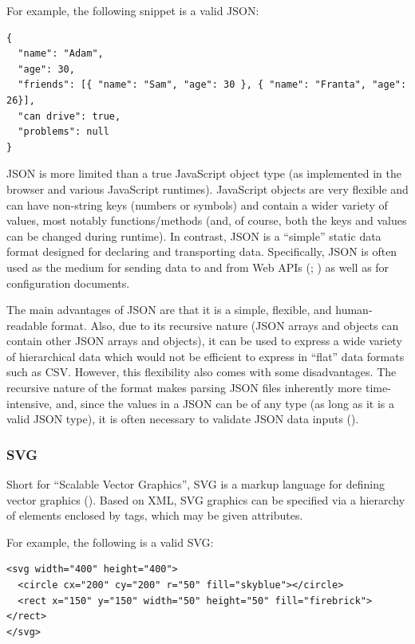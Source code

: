 \documentclass[
]{book}
\theoremstyle{definition}
\theoremstyle{definition}
\theoremstyle{definition}
\theoremstyle{definition}
\theoremstyle{remark}
\begin{document}
For example, the following snippet is a valid JSON:

\begin{verbatim}
{
  "name": "Adam",
  "age": 30,
  "friends": [{ "name": "Sam", "age": 30 }, { "name": "Franta", "age": 26}],
  "can drive": true,
  "problems": null
}
\end{verbatim}

JSON is more limited than a true JavaScript object type (as implemented in the browser and various JavaScript runtimes). JavaScript objects are very flexible and can have non-string keys (numbers or symbols) and contain a wider variety of values, most notably functions/methods (and, of course, both the keys and values can be changed during runtime). In contrast, JSON is a ``simple'' static data format designed for declaring and transporting data. Specifically, JSON is often used as the medium for sending data to and from Web APIs (; ) as well as for configuration documents.

The main advantages of JSON are that it is a simple, flexible, and human-readable format. Also, due to its recursive nature (JSON arrays and objects can contain other JSON arrays and objects), it can be used to express a wide variety of hierarchical data which would not be efficient to express in ``flat'' data formats such as CSV. However, this flexibility also comes with some disadvantages. The recursive nature of the format makes parsing JSON files inherently more time-intensive, and, since the values in a JSON can be of any type (as long as it is a valid JSON type), it is often necessary to validate JSON data inputs ().

\subsubsection{SVG}\label{svg}

Short for ``Scalable Vector Graphics'', SVG is a markup language for defining vector graphics (). Based on XML, SVG graphics can be specified via a hierarchy of elements enclosed by tags, which may be given attributes.

For example, the following is a valid SVG:

\begin{verbatim}
<svg width="400" height="400">
  <circle cx="200" cy="200" r="50" fill="skyblue"></circle>
  <rect x="150" y="150" width="50" height="50" fill="firebrick"></rect>
</svg>
\end{verbatim}
\end{document}
